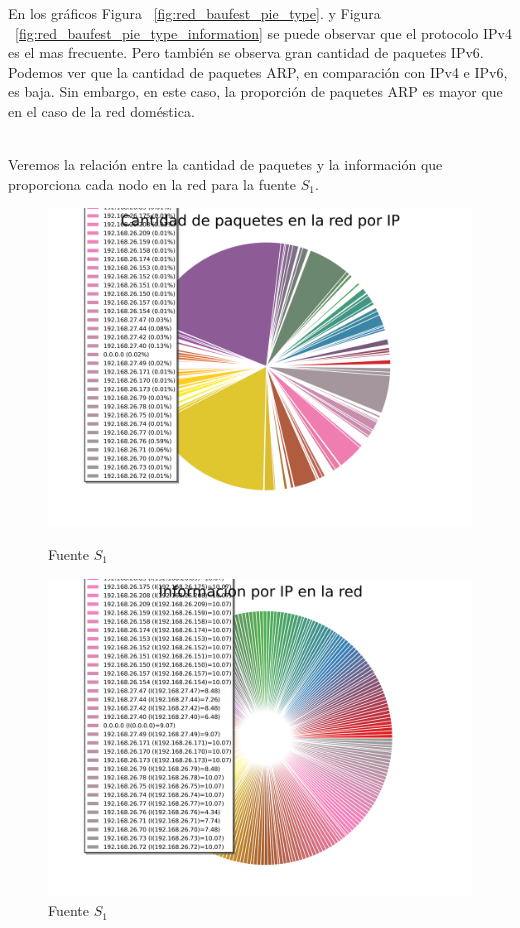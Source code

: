 En los gráficos Figura ~\ref{fig:red_baufest_pie_type}. y Figura ~\ref{fig:red_baufest_pie_type_information} se puede observar que el protocolo IPv4 es el mas frecuente. Pero también se observa gran cantidad de paquetes IPv6.
\\
Podemos ver que la cantidad de paquetes ARP, en comparación con IPv4 e IPv6, es baja. Sin embargo, en este caso, la proporción de paquetes ARP es mayor que en el caso de la red doméstica. 
\\
\\
\FloatBarrier

Veremos la relación entre la cantidad de paquetes y la información que proporciona cada nodo en la red para la fuente $S_1$. 

\begin{figure}[ht!]
  \centering
  \begin{minipage}[b]{0.48\textwidth}
    \includegraphics[width=\textwidth]{graficos/red_baufest_pie_arp.png}
    \caption{Fuente $S_1$}
    \label{fig:red_baufest_pie_arp}
  \end{minipage}
  \hfill
  \begin{minipage}[b]{0.48\textwidth}
    \includegraphics[width=\textwidth]{graficos/red_baufest_pie_arp_information.png}
    \caption{Fuente $S_1$}
    \label{fig:red_baufest_pie_arp_information}
  \end{minipage}
\end{figure}


